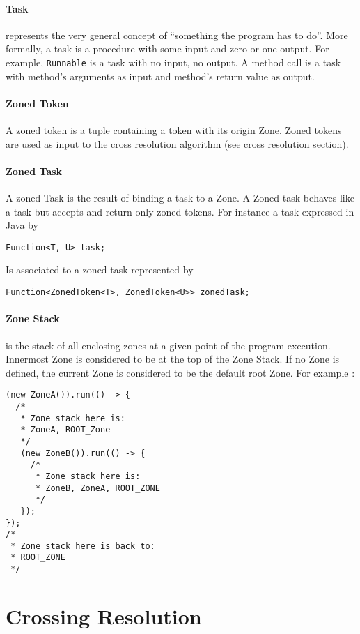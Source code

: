 \paragraph{Task} represents the very general concept of ``something the program has to do''. More formally, a task is a procedure with some input and zero or one output. For example, \lstinline{Runnable} is a task with no input, no output. A method call is a task with method's arguments as input and method's return value as output.

\paragraph{Zoned Token} A zoned token is a tuple containing a token with its origin Zone. Zoned tokens are used as input to the cross resolution algorithm (see cross resolution section).

\paragraph{Zoned Task} A zoned Task is the result of binding a task to a Zone. A Zoned task behaves like a task but accepts and return only zoned tokens. For instance a task expressed in Java by
\begin{lstlisting}
Function<T, U> task;
\end{lstlisting}
Is associated to a zoned task represented by
\begin{lstlisting}
Function<ZonedToken<T>, ZonedToken<U>> zonedTask;
\end{lstlisting}

\paragraph{Zone Stack} is the stack of all enclosing zones at a given point of the program execution. Innermost Zone is considered to be at the top of the Zone Stack. If no Zone is defined, the current Zone is considered to be the default root Zone. For example :

\begin{lstlisting}
(new ZoneA()).run(() -> {
  /*
   * Zone stack here is:
   * ZoneA, ROOT_Zone
   */
   (new ZoneB()).run(() -> {
     /*
      * Zone stack here is:
      * ZoneB, ZoneA, ROOT_ZONE
      */
   });
});
/*
 * Zone stack here is back to:
 * ROOT_ZONE
 */
\end{lstlisting}

\section{Crossing Resolution}
\label{sec:cross-res}

